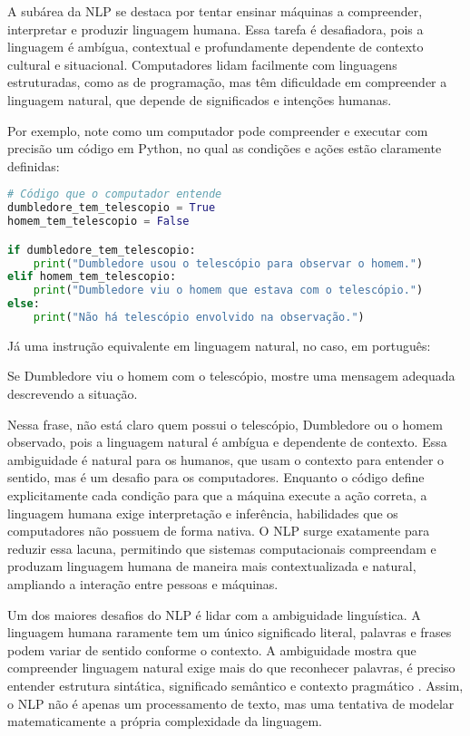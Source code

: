 A subárea da NLP se destaca por tentar ensinar máquinas a compreender, interpretar e produzir linguagem humana. Essa tarefa é desafiadora, pois a linguagem é ambígua, contextual e profundamente dependente de contexto cultural e situacional. Computadores lidam facilmente com linguagens estruturadas, como as de programação, mas têm dificuldade em compreender a linguagem natural, que depende de significados e intenções humanas.

Por exemplo, note como um computador pode compreender e executar com precisão um código em Python, no qual as condições e ações estão claramente definidas:
\begin{lstlisting}[language=Python, style=input]
# Código que o computador entende
dumbledore_tem_telescopio = True
homem_tem_telescopio = False

if dumbledore_tem_telescopio:
    print("Dumbledore usou o telescópio para observar o homem.")
elif homem_tem_telescopio:
    print("Dumbledore viu o homem que estava com o telescópio.")
else:
    print("Não há telescópio envolvido na observação.")
\end{lstlisting}

\noindent Já uma instrução equivalente em linguagem natural, no caso, em português:
\begin{tcolorbox}[
  colback=yellow!20, 
  colframe=black,
  width=0.8\linewidth,   %
  left=0pt,               %
  boxsep=2mm,
  enlarge left by=0.1\linewidth  %
]
Se Dumbledore viu o homem com o telescópio, mostre uma mensagem adequada descrevendo a situação.
\end{tcolorbox}
Nessa frase, não está claro quem possui o telescópio, Dumbledore ou o homem observado, pois a linguagem natural é ambígua e dependente de contexto. Essa ambiguidade é natural para os humanos, que usam o contexto para entender o sentido, mas é um desafio para os computadores.
Enquanto o código define explicitamente cada condição para que a máquina execute a ação correta, a linguagem humana exige interpretação e inferência, habilidades que os computadores não possuem de forma nativa.
O NLP surge exatamente para reduzir essa lacuna, permitindo que sistemas computacionais compreendam e produzam linguagem humana de maneira mais contextualizada e natural, ampliando a interação entre pessoas e máquinas.

Um dos maiores desafios do NLP é lidar com a ambiguidade linguística. A linguagem humana raramente tem um único significado literal, palavras e frases podem variar de sentido conforme o contexto. A ambiguidade mostra que compreender linguagem natural exige mais do que reconhecer palavras, é preciso entender estrutura sintática, significado semântico e contexto pragmático \cite{jurafsky2023speech}.
Assim, o NLP não é apenas um processamento de texto, mas uma tentativa de modelar matematicamente a própria complexidade da linguagem.

